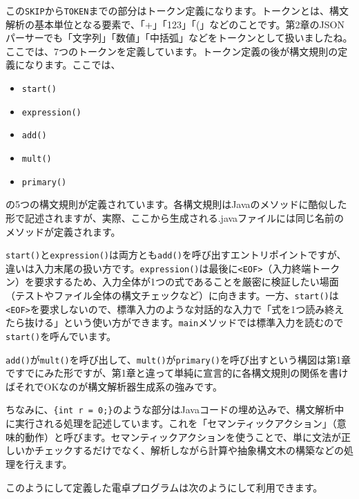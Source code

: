 この\texttt{SKIP}から\texttt{TOKEN}までの部分はトークン定義になります。トークンとは、構文解析の基本単位となる要素で、「+」「123」「(」などのことです。第2章のJSONパーサーでも「文字列」「数値」「中括弧」などをトークンとして扱いましたね。ここでは、7つのトークンを定義しています。トークン定義の後が構文規則の定義になります。ここでは、

\begin{itemize}
\item
  \texttt{start()}
\item
  \texttt{expression()}
\item
  \texttt{add()}
\item
  \texttt{mult()}
\item
  \texttt{primary()}
\end{itemize}

\noindent の5つの構文規則が定義されています。各構文規則はJavaのメソッドに酷似した形で記述されますが、実際、ここから生成される.javaファイルには同じ名前のメソッドが定義されます。

\texttt{start()}と\texttt{expression()}は両方とも\texttt{add()}を呼び出すエントリポイントですが、違いは入力末尾の扱い方です。\texttt{expression()}は最後に\texttt{\textless{}EOF\textgreater{}}（入力終端トークン）を要求するため、入力全体が1つの式であることを厳密に検証したい場面（テストやファイル全体の構文チェックなど）に向きます。一方、\texttt{start()}は\texttt{\textless{}EOF\textgreater{}}を要求しないので、標準入力のような対話的な入力で「式を1つ読み終えたら抜ける」という使い方ができます。\texttt{main}メソッドでは標準入力を読むので\texttt{start()}を呼んでいます。

\texttt{add()}が\texttt{mult()}を呼び出して、\texttt{mult()}が\texttt{primary()}を呼び出すという構図は第1章ですでにみた形ですが、第1章と違って単純に宣言的に各構文規則の関係を書けばそれでOKなのが構文解析器生成系の強みです。

ちなみに、\texttt{\{int\ r\ =\ 0;\}}のような部分はJavaコードの埋め込みで、構文解析中に実行される処理を記述しています。これを「セマンティックアクション」（意味的動作）と呼びます。セマンティックアクションを使うことで、単に文法が正しいかチェックするだけでなく、解析しながら計算や抽象構文木の構築などの処理を行えます。

このようにして定義した電卓プログラムは次のようにして利用できます。

